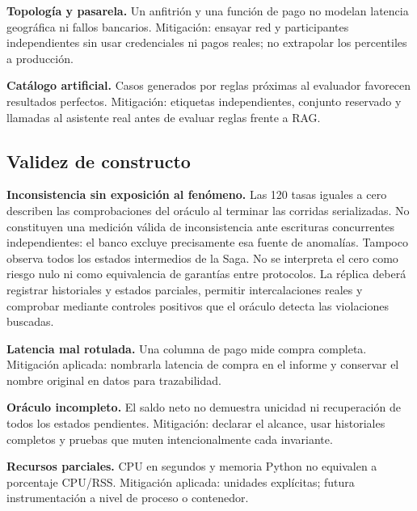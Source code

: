\documentclass[12pt,a4paper]{article}
\begin{document}
\textbf{Topología y pasarela.} Un anfitrión y una función de pago no modelan latencia geográfica ni fallos bancarios. Mitigación: ensayar red y participantes independientes sin usar credenciales ni pagos reales; no extrapolar los percentiles a producción.

\textbf{Catálogo artificial.} Casos generados por reglas próximas al evaluador favorecen resultados perfectos. Mitigación: etiquetas independientes, conjunto reservado y llamadas al asistente real antes de evaluar reglas frente a RAG.

\subsection{Validez de constructo}
\textbf{Inconsistencia sin exposición al fenómeno.} Las 120 tasas iguales a cero describen las comprobaciones del oráculo al terminar las corridas serializadas. No constituyen una medición válida de inconsistencia ante escrituras concurrentes independientes: el banco excluye precisamente esa fuente de anomalías. Tampoco observa todos los estados intermedios de la Saga. No se interpreta el cero como riesgo nulo ni como equivalencia de garantías entre protocolos. La réplica deberá registrar historiales y estados parciales, permitir intercalaciones reales y comprobar mediante controles positivos que el oráculo detecta las violaciones buscadas.

\textbf{Latencia mal rotulada.} Una columna de pago mide compra completa. Mitigación aplicada: nombrarla latencia de compra en el informe y conservar el nombre original en datos para trazabilidad.

\textbf{Oráculo incompleto.} El saldo neto no demuestra unicidad ni recuperación de todos los estados pendientes. Mitigación: declarar el alcance, usar historiales completos y pruebas que muten intencionalmente cada invariante.

\textbf{Recursos parciales.} CPU en segundos y memoria Python no equivalen a porcentaje CPU/RSS. Mitigación aplicada: unidades explícitas; futura instrumentación a nivel de proceso o contenedor.
\end{document}
